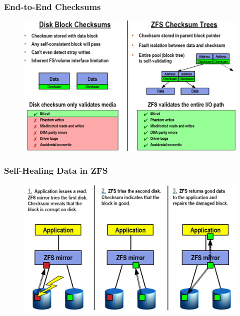 % 
% 
% 
% 
% 
% 
% 
\begin{frame}[fragile]
    \frametitle{End-to-End Checksums}
    \begin{figure}
    \includegraphics[width=0.7\linewidth]{figs/ZFS-checksum.png}
    \end{figure}
\end{frame}
% 
% 
\begin{frame}[fragile]
    \frametitle{Self-Healing Data in ZFS}
    \begin{figure}
    \includegraphics[width=0.8\linewidth]{figs/ZFS-self-healing.png}
    \end{figure}
\end{frame}
